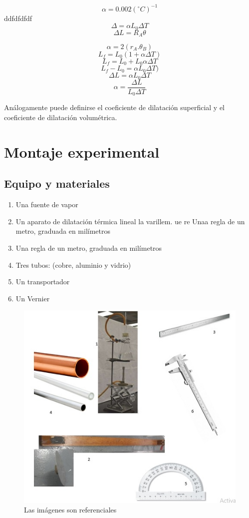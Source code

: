 \documentclass{article}
\begin{document}
    $$\alpha = 0.002(^{\circ}C)^{-1}$$
\hbox{ddfdfdfdf}
$$\Delta = \alpha L_{0} \Delta T$$
$$\Delta L = R_{A} \theta$$

$$\alpha = 2(r_{A}.\theta_{B})$$
$$L_{f} = L_{0}(1 + \alpha\Delta T)$$
$$L_{f} = L_{0} + L_{0} \alpha\Delta T$$
$$L_{f} - L_{0} =  \alpha L_{0} \Delta T)$$
$$\Delta L = \alpha L_{0} \Delta T$$
$$\alpha = \frac{\Delta L}{L_{0} \Delta T}$$


Análogamente puede definirse el coeficiente de dilatación superficial y el coeficiente de dilatación volumétrica.
\newpage
\section{Montaje experimental}

\subsection{Equipo y materiales}
\begin{enumerate}
    \item Una fuente de vapor
	\item Un aparato de dilatación térmica lineal %
	\itposa la varillem.
	ue re Unaa  regla de un metro, graduada en milímetros
	\item Una regla de un metro, graduada en milímetros
	\item Tres tubos: (cobre, aluminio y vidrio)
	\item Un transportador
	\item Un Vernier
\end{enumerate}
\begin{figure}[H]
    \centering
    \includegraphics{materiales}
    \caption{Las imágenes son referenciales}
    \label{fig:my_label}
\end{figure}
    
\end{document}
